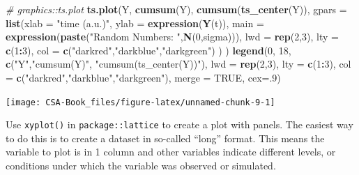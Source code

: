 \documentclass[12pt,]{book}
\newenvironment{Shaded}{\begin{snugshade}}{\end{snugshade}}
\newcommand{\CommentTok}[1]{\textcolor[rgb]{0.56,0.35,0.01}{\textit{#1}}}
\newcommand{\DataTypeTok}[1]{\textcolor[rgb]{0.13,0.29,0.53}{#1}}
\newcommand{\DecValTok}[1]{\textcolor[rgb]{0.00,0.00,0.81}{#1}}
\newcommand{\KeywordTok}[1]{\textcolor[rgb]{0.13,0.29,0.53}{\textbf{#1}}}
\newcommand{\NormalTok}[1]{#1}
\newcommand{\OperatorTok}[1]{\textcolor[rgb]{0.81,0.36,0.00}{\textbf{#1}}}
\newcommand{\OtherTok}[1]{\textcolor[rgb]{0.56,0.35,0.01}{#1}}
\newcommand{\StringTok}[1]{\textcolor[rgb]{0.31,0.60,0.02}{#1}}
\begin{document}
\begin{Shaded}
\begin{Highlighting}[]
\CommentTok{# graphics::ts.plot}
\KeywordTok{ts.plot}\NormalTok{(Y,}
        \KeywordTok{cumsum}\NormalTok{(Y), }
        \KeywordTok{cumsum}\NormalTok{(}\KeywordTok{ts_center}\NormalTok{(Y)),}
        \DataTypeTok{gpars =} \KeywordTok{list}\NormalTok{(}\DataTypeTok{xlab =} \StringTok{"time (a.u.)"}\NormalTok{,}
                     \DataTypeTok{ylab =} \KeywordTok{expression}\NormalTok{(}\KeywordTok{Y}\NormalTok{(t)),}
                     \DataTypeTok{main =} \KeywordTok{expression}\NormalTok{(}\KeywordTok{paste}\NormalTok{(}\StringTok{"Random Numbers: "}\NormalTok{,}\KeywordTok{N}\NormalTok{(}\DecValTok{0}\NormalTok{,sigma))),}
                     \DataTypeTok{lwd =} \KeywordTok{rep}\NormalTok{(}\DecValTok{2}\NormalTok{,}\DecValTok{3}\NormalTok{),}
                     \DataTypeTok{lty =} \KeywordTok{c}\NormalTok{(}\DecValTok{1}\OperatorTok{:}\DecValTok{3}\NormalTok{),}
                     \DataTypeTok{col =} \KeywordTok{c}\NormalTok{(}\StringTok{"darkred"}\NormalTok{,}\StringTok{"darkblue"}\NormalTok{,}\StringTok{"darkgreen"}\NormalTok{)}
\NormalTok{                     )}
\NormalTok{        )}
\KeywordTok{legend}\NormalTok{(}\DecValTok{0}\NormalTok{, }\DecValTok{18}\NormalTok{, }\KeywordTok{c}\NormalTok{(}\StringTok{"Y"}\NormalTok{,}\StringTok{"cumsum(Y)"}\NormalTok{, }\StringTok{"cumsum(ts_center(Y))"}\NormalTok{), }\DataTypeTok{lwd =} \KeywordTok{rep}\NormalTok{(}\DecValTok{2}\NormalTok{,}\DecValTok{3}\NormalTok{), }\DataTypeTok{lty =} \KeywordTok{c}\NormalTok{(}\DecValTok{1}\OperatorTok{:}\DecValTok{3}\NormalTok{), }\DataTypeTok{col =} \KeywordTok{c}\NormalTok{(}\StringTok{"darkred"}\NormalTok{,}\StringTok{"darkblue"}\NormalTok{,}\StringTok{"darkgreen"}\NormalTok{), }\DataTypeTok{merge =} \OtherTok{TRUE}\NormalTok{, }\DataTypeTok{cex=}\NormalTok{.}\DecValTok{9}\NormalTok{)}
\end{Highlighting}
\end{Shaded}

\begin{center}\texttt{[image: CSA-Book\_files/figure-latex/unnamed-chunk-9-1]} \end{center}

Use \texttt{xyplot()} in \texttt{package::lattice} to create a plot with panels. The easiest way to do this is to create a dataset in so-called ``long'' format. This means the variable to plot is in 1 column and other variables indicate different levels, or conditions under which the variable was observed or simulated.
\end{document}
